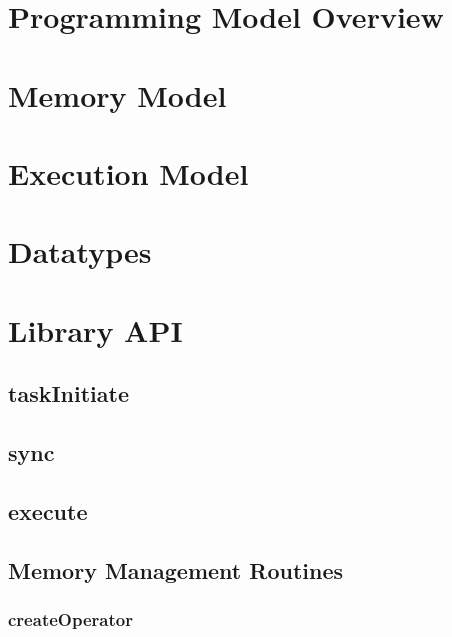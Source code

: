 \documentclass[10pt]{book}
\begin{document}


\section{Programming Model Overview}\label{subsec:programming_model}


\section{Memory Model}\label{subsec:memory_model}


\section{Execution Model}\label{subsec:execution_model}


\section{Datatypes}\label{subsec:datatypes}


\clearpage

\section{\qcor Library API}\label{sec:qcor_library_api}
\subsection{\textbf{taskInitiate}}\label{subsec:taskInitiate}


\subsection{\textbf{sync}}\label{subsec:sync}


\subsection{\textbf{execute}}\label{subsec:execute}



\subsection{Memory Management Routines}
\subsubsection{\textbf{createOperator}}\label{subsec:createop}

\end{document}
